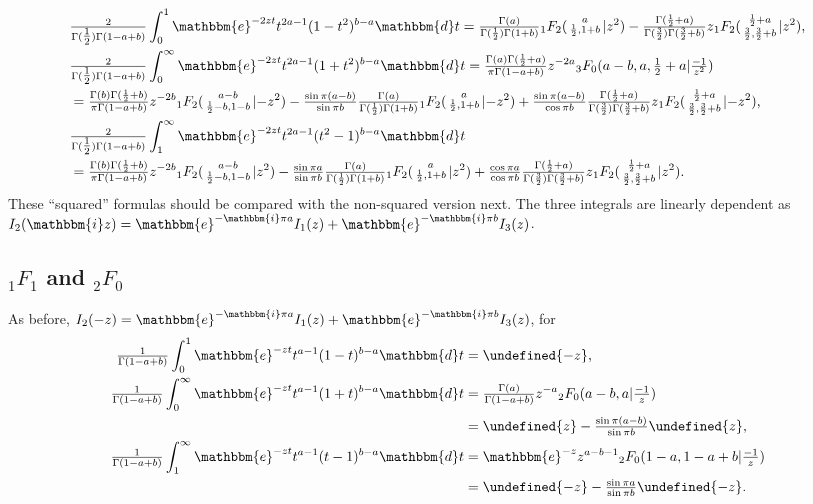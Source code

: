 \documentclass[12pt]{article}
\newcommand{\ee}[0] {\mathbbm{e}}
\newcommand{\ii}[0] {\mathbbm{i}}
\newcommand{\dd}[0] {\mathbbm{d}}
\numberwithin{equation}{section}
\newcommand{\FFs}[6] {{}_{#1}{#2}_{#3} ( \begin{smallmatrix} #4 \\ #5 \end{smallmatrix} | {#6}  )}
\begin{document}
\newcommand{\soltwo}[1] {\tfrac{\Gamma(b)\Gamma(\frac12+b)}{\pi \Gamma(1-a+b)} z^{-2b} \FFs{1}{F}{2}{a-b}{\frac12-b,1-b}{#1}}

\newcommand{\solzero}[1] {\tfrac{\Gamma(a)}{\Gamma(\frac12) \Gamma(1+b)} \FFs{1}{F}{2}{a}{\frac12,1+b}{#1}}

\newcommand{\solone}[1] {\tfrac{\Gamma(\frac12+a)}{\Gamma(\frac32) \Gamma(\frac32 + b)} z \FFs{1}{F}{2}{\frac12+a}{\frac32, \frac32+b}{#1}}

\begin{align*}
&\tfrac{2}{\Gamma(\tfrac12) \Gamma(1-a+b)} \int_0^1 \ee^{-2 z t} t^{2a-1} (1-t^2)^{b-a} \dd t = \solzero{z^2} - \solone{z^2}\text{,}\\
&\tfrac{2}{\Gamma(\tfrac12) \Gamma(1-a+b)} \int_0^{\infty} \ee^{-2 z t} t^{2a-1} (1+t^2)^{b-a} \dd t = \tfrac{\Gamma(a)\Gamma(\frac12+a)}{\pi \Gamma(1-a+b)} z^{-2a} {}_3 F_0(a-b,a,\tfrac12+a|\tfrac{-1}{z^2})\\
 &= \soltwo{-z^2} - \tfrac{\sin \pi (a-b)}{\sin \pi b} \solzero{-z^2} + \tfrac{\sin \pi (a-b)}{\cos \pi b} \solone{-z^2}\text{,}\\
 &\tfrac{2}{\Gamma(\tfrac12) \Gamma(1-a+b)} \int_1^{\infty} \ee^{-2 z t} t^{2a-1} (t^2-1)^{b-a} \dd t\\ 
&= \soltwo{z^2} - \tfrac{\sin \pi a}{\sin \pi b} \solzero{z^2} + \tfrac{\cos \pi a}{\cos \pi b} \solone{z^2}\text{.}
\end{align*}
\let\soltwo\undefined
\let\solone\undefined
\let\solzero\undefined
These ``squared'' formulas should be compared with the non-squared version next. The three integrals are linearly dependent as $I_2(\ii z) = \ee^{-\ii \pi a } I_1(z) + \ee^{-\ii \pi b} I_3(z)$.

\subsection{${}_1 F_1$ and ${}_2 F_0$}
As before, $I_2(-z) = \ee^{-\ii \pi a } I_1(z) + \ee^{-\ii \pi b} I_3(z)$, for
\newcommand{\soltwo}[1] {\tfrac{\Gamma(b)}{ \Gamma(1-a+b)} z^{-b} \FFs{1}{F}{1}{a-b}{1-b}{#1}}
\newcommand{\solzero}[1] {\tfrac{\Gamma(a)}{ \Gamma(1+b)} \FFs{1}{F}{1}{a}{1+b}{#1}}
\begin{align*}
\tfrac{1}{\Gamma(1-a+b)} \int_0^1 \ee^{-z t} t^{a-1} (1-t)^{b-a} \dd t &= \solzero{-z}\text{,}\\
\tfrac{1}{\Gamma(1-a+b)} \int_0^{\infty} \ee^{-z t} t^{a-1} (1+t)^{b-a} \dd t &= \tfrac{\Gamma(a)}{\Gamma(1-a+b)} z^{-a} {}_2 F_0(a-b,a|\tfrac{-1}{z})\\
 &= \soltwo{z} - \tfrac{\sin \pi (a-b)}{\sin \pi b} \solzero{z}\text{,}\\
\tfrac{1}{\Gamma(1-a+b)} \int_1^{\infty} \ee^{-z t} t^{a-1} (t-1)^{b-a} \dd t &= \ee^{-z} z^{a-b-1} {}_2 F_0(1-a,1-a+b|\tfrac{-1}{z})\\ 
&= \soltwo{-z} - \tfrac{\sin \pi a}{\sin \pi b} \solzero{-z}\text{.}
\end{align*}
\let\soltwo\undefined
\let\solzero\undefined
\end{document}
